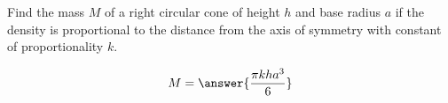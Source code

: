 \documentclass{ximera}
\author{David Guichard \and Neal Koblitz \and H. Jerome Keisler \and Albert Scheller \and Barry Balof \and Mike Wills \and Matthew Carr}
\begin{document}
\begin{exercise}




Find the mass $M$ of a right circular cone of height $h$ and base radius $a$ if the density is proportional to the distance from the axis of symmetry with constant of proportionality $k$.
 
\begin{prompt}
\[
M=\answer{\frac{\pi k h a^3}{6}}
\]
\end{prompt}



\end{exercise}
\end{document}
